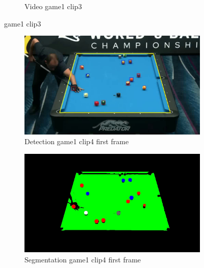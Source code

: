 \begin{figure}[H]
\begin{subfigure}[b]{0.48\textwidth}
    	\caption{Video game1 clip3}
    	\label{fig: game1_clip3_video}
    \end{subfigure}

	\caption{game1 clip3}
\end{figure}

\begin{figure}[H]
    \centering
    \begin{subfigure}[b]{0.48\textwidth}
        \centering
        \includegraphics[width=\textwidth]{images/Detection/game1_clip4_detected_balls_first_frame.jpg}
        \caption{Detection game1 clip4 first frame}
        \label{fig: game1_clip4_first_frame_detected}
    \end{subfigure}
    \begin{subfigure}[b]{0.48\textwidth}
        \centering
        \includegraphics[width=\textwidth]{images/Segmentation/game1_clip4_segmented_balls_first_frame.jpg}
        \caption{Segmentation game1 clip4 first frame}
		\label{fig: game1_clip4_first_frame_segmented}
    \end{subfigure}
    \begin{subfigure}[b]{0.48\textwidth}

\end{subfigure}
\end{figure}
